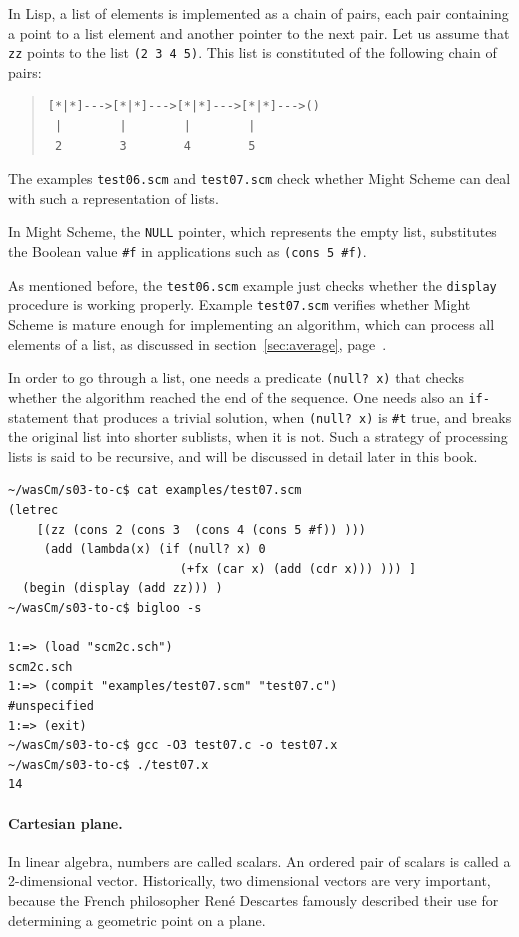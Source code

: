 \documentclass[a4paper,12pt]{book}
\begin{document}
 In Lisp, a list of elements is implemented as a chain
 of pairs, each pair containing a point to a list element
 and another pointer to the next pair. Let us assume
 that \verb|zz| points to the list \verb|(2 3 4 5)|.
 This list is constituted of the following chain of pairs:
\begin{quote}
\begin{verbatim}
[*|*]--->[*|*]--->[*|*]--->[*|*]--->()
 |        |        |        |        
 2        3        4        5       
\end{verbatim}
\end{quote}
The examples \verb|test06.scm| and \verb|test07.scm| check
whether Might Scheme can deal with such a representation
of lists. 

In Might Scheme, the \verb|NULL| pointer, which
represents the empty list, substitutes the Boolean value
\verb|#f| in applications such as \verb|(cons 5 #f)|.

As mentioned before, the \verb|test06.scm| example just
checks whether the \verb|display| procedure is working
properly. Example \verb|test07.scm| verifies whether
Might Scheme is mature enough for implementing an
algorithm, which can process all elements of a list,
as discussed in section~\ref{sec:average},
page~\pageref{sec:average}.

In order to go through a list, one needs a predicate
\verb|(null? x)| that checks whether the algorithm
reached the end of the sequence. One needs also an
\verb|if-|statement that produces a trivial solution,
when \verb|(null? x)| is \verb|#t| true, and breaks the
original list into shorter sublists, when it is not.
Such a strategy of processing lists is said to be
recursive, and will be discussed in detail later in
this book.

\begin{verbatim}
~/wasCm/s03-to-c$ cat examples/test07.scm 
(letrec
    [(zz (cons 2 (cons 3  (cons 4 (cons 5 #f)) )))
     (add (lambda(x) (if (null? x) 0 
                        (+fx (car x) (add (cdr x))) ))) ]
  (begin (display (add zz))) )
~/wasCm/s03-to-c$ bigloo -s

1:=> (load "scm2c.sch")
scm2c.sch
1:=> (compit "examples/test07.scm" "test07.c")
#unspecified
1:=> (exit)
~/wasCm/s03-to-c$ gcc -O3 test07.c -o test07.x
~/wasCm/s03-to-c$ ./test07.x 
14
\end{verbatim}

\paragraph{Cartesian plane.} In linear algebra, numbers
are called scalars. An ordered pair of scalars is called
a 2-dimensional vector. Historically, two dimensional
vectors are very important, because the French philosopher
René Descartes famously described their use for determining
a geometric point on a plane.
\end{document}
